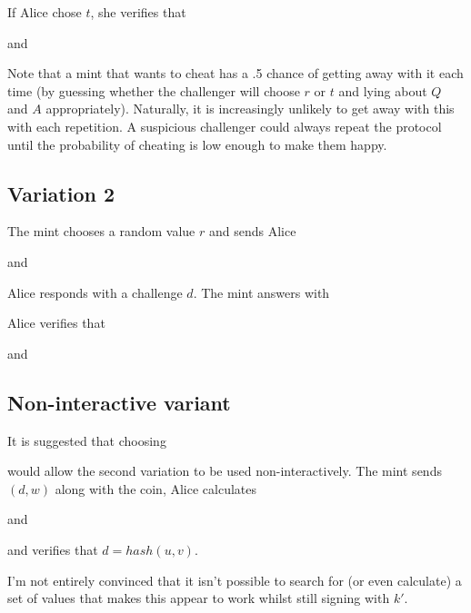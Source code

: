 \documentclass[a4paper,titlepage]{article}
\begin{document}
If Alice chose $t$, she verifies that


and


Note that a mint that wants to cheat has a .5 chance of getting away
with it each time (by guessing whether the challenger will choose $r$
or $t$ and lying about $Q$ and $A$ appropriately). Naturally, it is
increasingly unlikely to get away with this with each repetition. A
suspicious challenger could always repeat the protocol until the
probability of cheating is low enough to make them happy.

\subsection{Variation 2\cite{Chaum}}

The mint chooses a random value $r$ and sends Alice


and


Alice responds with a challenge $d$. The mint answers with


Alice verifies that


and


\subsection{Non-interactive variant}

It is suggested that choosing


would allow the second variation to be used non-interactively. The
mint sends $(d,w)$ along with the coin, Alice calculates


and


and verifies that $d=hash(u,v)$.

I'm not entirely convinced that it isn't possible to search for (or
even calculate) a set of values that makes this appear to work whilst
still signing with $k'$.
\end{document}
